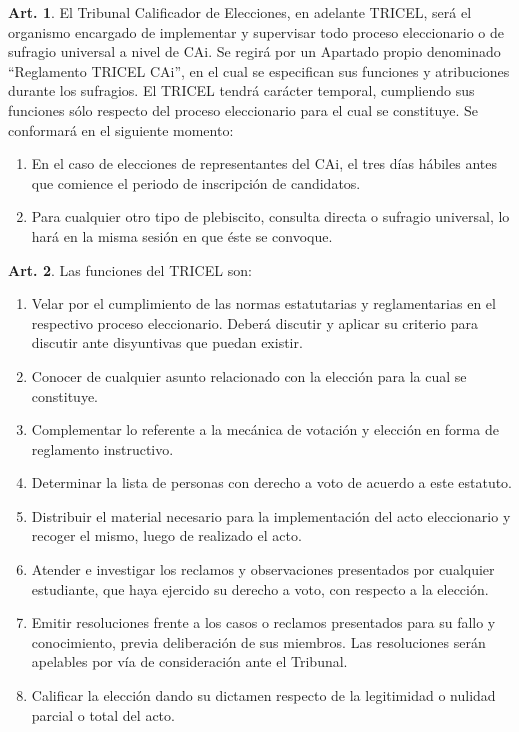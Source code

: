 \documentclass[letterpaper,11pt]{article}
\theoremstyle{definition}%
\newtheorem{art}{Art.} %
\begin{document}
\begin{art}\label{definicionTRICEL}
	El Tribunal Calificador de Elecciones, en adelante TRICEL, será el organismo encargado de implementar y supervisar todo proceso eleccionario o de sufragio universal a nivel de CAi. Se regirá por un Apartado propio denominado ``Reglamento TRICEL CAi'', en el cual se especifican sus funciones y atribuciones durante los sufragios. El TRICEL tendrá carácter temporal, cumpliendo sus funciones sólo respecto del proceso eleccionario para el cual se constituye. Se conformará en el siguiente momento:
	\begin{enumerate}
		\item En el caso de elecciones de representantes del CAi, el tres días hábiles antes que comience el periodo de inscripción de candidatos.
		\item Para cualquier otro tipo de plebiscito, consulta directa o sufragio universal, lo hará en la misma sesión en que éste se convoque.
	\end{enumerate}
\end{art}

\begin{art}\label{funcionesTRICEL}
	Las funciones del TRICEL son:
	\begin{enumerate}
		\item Velar por el cumplimiento de las normas estatutarias y reglamentarias en el respectivo proceso eleccionario. Deberá discutir y aplicar su criterio para discutir ante disyuntivas que puedan existir.
		\item Conocer de cualquier asunto relacionado con la elección para la cual se constituye.
		\item Complementar lo referente a la mecánica de votación y elección en forma de reglamento instructivo.
		\item Determinar la lista de personas con derecho a voto de acuerdo a este estatuto.
		\item Distribuir el material necesario para la implementación del acto eleccionario y recoger el mismo, luego de realizado el acto.
		\item Atender e investigar los reclamos y observaciones presentados por cualquier estudiante, que haya ejercido su derecho a voto, con respecto a la elección.
		\item Emitir resoluciones frente a los casos o reclamos presentados para su fallo y conocimiento, previa deliberación de sus miembros. Las resoluciones serán apelables por vía de consideración ante el Tribunal.
		\item Calificar la elección dando su dictamen respecto de la legitimidad o nulidad parcial o total del acto.
	\end{enumerate}
\end{art}
\end{document}
